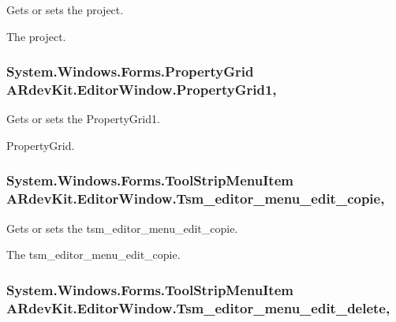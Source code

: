 Gets or sets the project. 

The project. \hypertarget{class_a_rdev_kit_1_1_editor_window_a8f5f7c03bcb123e147d07b5023a60292}{
\subsubsection[{Property\-Grid1}]{\setlength{\rightskip}{0pt plus 5cm}System.\-Windows.\-Forms.\-Property\-Grid A\-Rdev\-Kit.\-Editor\-Window.\-Property\-Grid1\hspace{0.3cm}{\ttfamily [get]}, {\ttfamily [set]}}}\label{class_a_rdev_kit_1_1_editor_window_a8f5f7c03bcb123e147d07b5023a60292}


Gets or sets the Property\-Grid1. 

Property\-Grid. \hypertarget{class_a_rdev_kit_1_1_editor_window_a7ce809e15aaf06e0d514989fb6292687}{
\subsubsection[{Tsm\-\_\-editor\-\_\-menu\-\_\-edit\-\_\-copie}]{\setlength{\rightskip}{0pt plus 5cm}System.\-Windows.\-Forms.\-Tool\-Strip\-Menu\-Item A\-Rdev\-Kit.\-Editor\-Window.\-Tsm\-\_\-editor\-\_\-menu\-\_\-edit\-\_\-copie\hspace{0.3cm}{\ttfamily [get]}, {\ttfamily [set]}}}\label{class_a_rdev_kit_1_1_editor_window_a7ce809e15aaf06e0d514989fb6292687}


Gets or sets the tsm\-\_\-editor\-\_\-menu\-\_\-edit\-\_\-copie. 

The tsm\-\_\-editor\-\_\-menu\-\_\-edit\-\_\-copie. \hypertarget{class_a_rdev_kit_1_1_editor_window_a94b80b86878dae463d966bd117732260}{
\subsubsection[{Tsm\-\_\-editor\-\_\-menu\-\_\-edit\-\_\-delete}]{\setlength{\rightskip}{0pt plus 5cm}System.\-Windows.\-Forms.\-Tool\-Strip\-Menu\-Item A\-Rdev\-Kit.\-Editor\-Window.\-Tsm\-\_\-editor\-\_\-menu\-\_\-edit\-\_\-delete\hspace{0.3cm}{\ttfamily [get]}, {\ttfamily [set]}}}\label{class_a_rdev_kit_1_1_editor_window_a94b80b86878dae463d966bd117732260}


